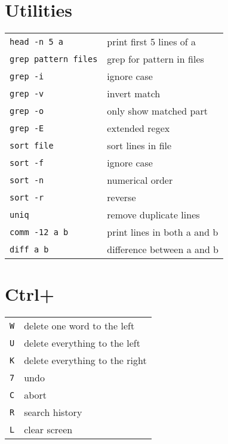 \documentclass[a4paper, twocolumn]{article}
\renewcommand{\tt}{\texttt}
\begin{document}
\section{Utilities}
\begin{tabular}{ll}
    \tt{head -n 5 a}        & print first 5 lines of a              \\
    \tt{grep pattern files} & grep for pattern in files             \\
    \tt{grep -i}            & ignore case                           \\
    \tt{grep -v}            & invert match                          \\
    \tt{grep -o}            & only show matched part                \\
    \tt{grep -E}            & extended regex                        \\
    \tt{sort file}          & sort lines in file                    \\
    \tt{sort -f}            & ignore case                           \\
    \tt{sort -n}            & numerical order                       \\
    \tt{sort -r}            & reverse                               \\
    \tt{uniq}               & remove duplicate lines                \\
    \tt{comm -12 a b}       & print lines in both a and b           \\
    \tt{diff a b}           & difference between a and b
\end{tabular}

\section{Ctrl+}
\begin{tabular}{ll}
    \tt{W} & delete one word to the left                           \\
    \tt{U} & delete everything to the left                         \\
    \tt{K} & delete everything to the right                        \\
    \tt{7} & undo                                                  \\
    \tt{C} & abort                                                 \\
    \tt{R} & search history                                        \\
    \tt{L} & clear screen
\end{tabular}
\end{document}
